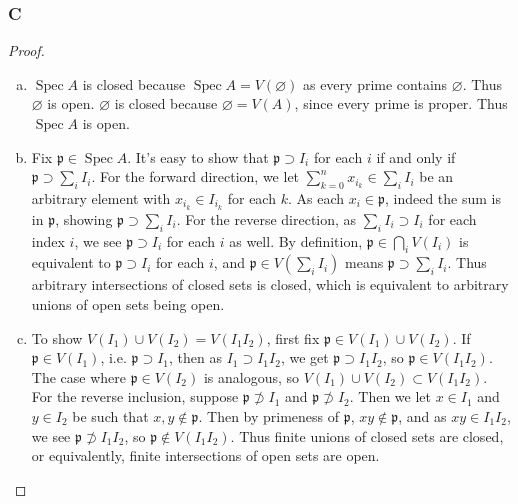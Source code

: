 \documentclass{article}
\newcommand{\frkp}{\mathfrak{p}}
\DeclareMathOperator{\Spec}{\mathrm{Spec}}
\let\emptyset\varnothing
\begin{document}
\subsubsection{C}\label{3.4.C}
\begin{proof}
    \begin{enumerate}[(a)]
        \item $\Spec A$ is closed because $\Spec A = V(\emptyset)$ as every prime contains $\emptyset$. Thus $\emptyset$ is open. $\emptyset$ is closed because $\emptyset = V(A)$, since every prime is proper. Thus $\Spec A$ is open.
        \item Fix $\frkp \in \Spec A$. It's easy to show that $\frkp \supset I_i$ for each $i$ if and only if $\frkp \supset \sum_i I_i$. For the forward direction, we let $\sum_{k=0}^n x_{i_k}\in \sum_i I_i$ be an arbitrary element with $x_{i_k}\in I_{i_k}$ for each $k$. As each $x_i\in \frkp$, indeed the sum is in $\frkp$, showing $\frkp \supset \sum_i I_i$. For the reverse direction, as $\sum_i I_i\supset I_i$ for each index $i$, we see $\frkp \supset I_i$ for each $i$ as well. By definition, $\frkp\in \bigcap_i V(I_i)$ is equivalent to $\frkp\supset I_i$ for each $i$, and $\frkp \in V(\sum_i I_i)$ means $\frkp \supset \sum_i I_i$. Thus arbitrary intersections of closed sets is closed, which is equivalent to arbitrary unions of open sets being open.
        \item To show $V(I_1)\cup V(I_2)=V(I_1I_2)$, first fix $\frkp \in V(I_1)\cup V(I_2)$. If $\frkp \in V(I_1)$, i.e. $\frkp \supset I_1$, then as $I_1\supset I_1I_2$, we get $\frkp \supset I_1I_2$, so $\frkp \in V(I_1I_2)$. The case where $\frkp \in V(I_2)$ is analogous, so $V(I_1)\cup V(I_2) \subset V(I_1I_2)$. For the reverse inclusion, suppose $\frkp \not \supset I_1$ and $\frkp \not \supset I_2$. Then we let $x\in I_1$ and $y\in I_2$ be such that $x,y\notin \frkp$. Then by primeness of $\frkp$, $xy\notin \frkp$, and as $xy\in I_1I_2$, we see $\frkp \not \supset I_1I_2$, so $\frkp \notin V(I_1I_2)$. Thus finite unions of closed sets are closed, or equivalently, finite intersections of open sets are open.
    \end{enumerate}
\end{proof}
\end{document}
